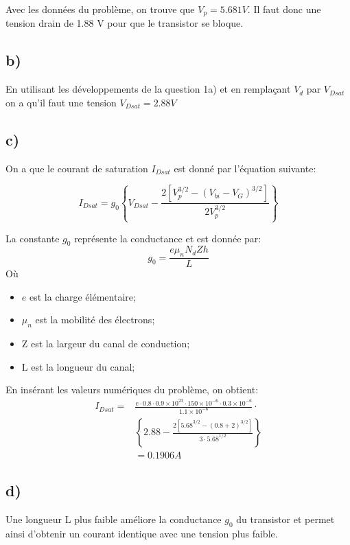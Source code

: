 Avec les données du problème, on trouve que $V_p = 5.681 V$. Il faut donc une tension drain de 1.88 V pour que le transistor se bloque.

\subsection*{b)}
En utilisant les développements de la question 1a) et en remplaçant $V_d$ par $V_{Dsat}$ on a qu'il faut une tension $V_{Dsat} = 2.88V$

\subsection*{c)}
On a que le courant de saturation $I_{Dsat}$ est donné par l'équation suivante:

\begin{equation}
I_{Dsat} = g_0 \left \lbrace V_{Dsat} - \frac{2\left[V_p^{3/2} - (V_{bi}-V_G)^{3/2}\right]}{2V_p^{3/2}}\right\rbrace
\end{equation}

La constante $g_0$ représente la conductance et est donnée par:
\begin{equation}
g_0 = \frac{e \mu_n N_d Zh}{L}
\end{equation}
Où
\begin{itemize}
\item $e$ est la charge élémentaire;
\item $\mu_n$ est la mobilité des électrons;
\item Z est la largeur du canal de conduction;
\item L est la longueur du canal;
\end{itemize}

En insérant les valeurs numériques du problème, on obtient: 
\begin{align}
I_{Dsat} = &\frac{e\cdot 0.8 \cdot 0.9\times 10^{23} \cdot 150\times 10^{-6} \cdot 0.3\times 10^{-6}}{1.1\times 10^{-6}}\cdot\\ 
&\left\lbrace 2.88 - \frac{2\left[5.68^{3/2} - (0.8+2)^{3/2}\right]}{3\cdot 5.68^{1/2}}\right\rbrace\\
&= 0.1906A
\end{align}
\subsection*{d)}

Une longueur L plus faible améliore la conductance $g_0$ du transistor et permet ainsi d'obtenir un courant identique avec une tension plus faible.

